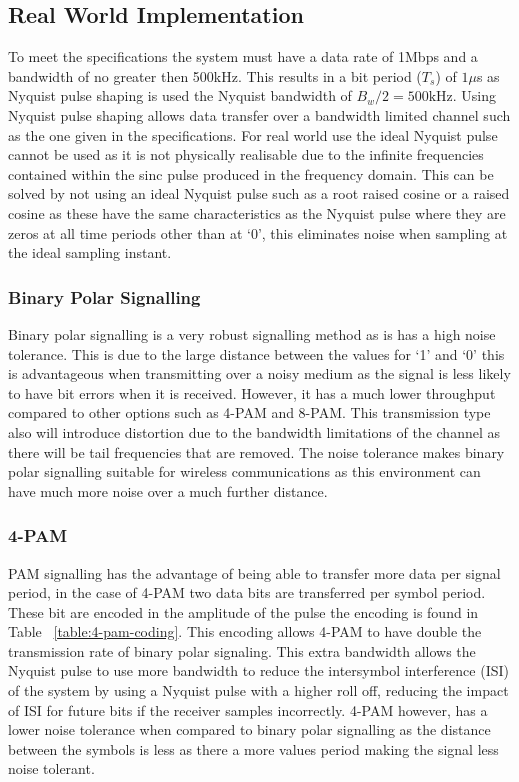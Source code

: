\subsection{Real World Implementation}

To meet the specifications the system must have a data rate of 1Mbps and a bandwidth of no greater then
500kHz. This results in a bit period ($T_s$) of $1\mu$s as Nyquist pulse shaping is used the Nyquist
bandwidth of $B_w / 2 = 500\textrm{kHz}$. Using Nyquist pulse shaping allows data transfer over a
bandwidth limited channel such as the one given in the specifications. For real world use the ideal
Nyquist pulse cannot be used as it is not physically realisable due to the infinite frequencies 
contained within the sinc pulse produced in the frequency domain. This can be solved by not using
an ideal Nyquist pulse such as a root raised cosine or a raised cosine as these have the same characteristics
as the Nyquist pulse where they are zeros at all time periods other than at `0', this eliminates noise
when sampling at the ideal sampling instant.

\subsubsection{Binary Polar Signalling}
Binary polar signalling is a very robust signalling method as is has a high noise tolerance. This is
due to the large distance between the values for `1' and `0' this is advantageous when transmitting
over a noisy medium as the signal is less likely to have bit errors when it is received.
However, it has a much lower throughput compared to other options such as 4-PAM and 8-PAM. This transmission type also
will introduce distortion due to the bandwidth limitations of the channel as there will be tail frequencies that are
removed. The noise tolerance makes binary polar signalling suitable for wireless communications as this environment 
can have much more noise over a much further distance.


\subsubsection{4-PAM}
PAM signalling has the advantage of being able to transfer more data per signal period, in the case of 4-PAM
two data bits are transferred per symbol period. These bit are encoded in the amplitude of the pulse
the encoding is found in Table ~\ref{table:4-pam-coding}. This encoding allows 4-PAM to have double the transmission
rate of binary polar signaling. This extra bandwidth allows the Nyquist pulse to use more bandwidth to reduce the intersymbol
interference (ISI) of the system by using a Nyquist pulse with a higher roll off, reducing the impact of ISI for future bits
if the receiver samples incorrectly. 4-PAM however, has a lower noise tolerance when compared to binary polar signalling as
the distance between the symbols is less as there a more values period making the signal less noise tolerant.

